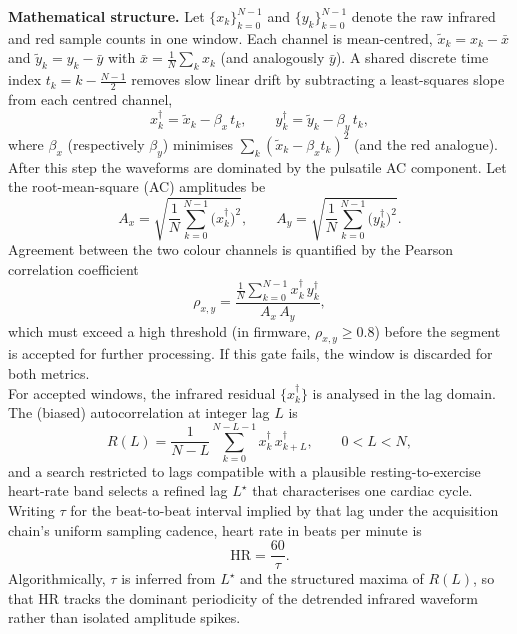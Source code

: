 \noindent \textbf{Mathematical structure.} Let $\{x_k\}_{k=0}^{N-1}$ and $\{y_k\}_{k=0}^{N-1}$ denote
the raw infrared and red sample counts in one window. Each channel is mean-centred,
$\tilde{x}_k = x_k - \bar{x}$ and $\tilde{y}_k = y_k - \bar{y}$ with $\bar{x}=\frac{1}{N}\sum_k x_k$
(and analogously $\bar{y}$). A shared discrete time index $t_k = k - \frac{N-1}{2}$ removes slow
linear drift by subtracting a least-squares slope from each centred channel,
\begin{equation}
  x^{\dagger}_k = \tilde{x}_k - \beta_x\, t_k, \qquad
  y^{\dagger}_k = \tilde{y}_k - \beta_y\, t_k,
\end{equation}
where $\beta_x$ (respectively $\beta_y$) minimises $\sum_k (\tilde{x}_k - \beta_x t_k)^2$ (and the
red analogue). After this step the waveforms are dominated by the pulsatile AC component. Let the
root-mean-square (AC) amplitudes be
\begin{equation}
  A_x = \sqrt{\frac{1}{N}\sum_{k=0}^{N-1} \bigl(x^{\dagger}_k\bigr)^2}, \qquad
  A_y = \sqrt{\frac{1}{N}\sum_{k=0}^{N-1} \bigl(y^{\dagger}_k\bigr)^2}.
\end{equation}
Agreement between the two colour channels is quantified by the Pearson correlation coefficient
\begin{equation}
  \rho_{x,y} =
  \frac{\frac{1}{N}\sum_{k=0}^{N-1} x^{\dagger}_k\, y^{\dagger}_k}{A_x\, A_y},
\end{equation}
which must exceed a high threshold (in firmware, $\rho_{x,y}\ge 0.8$) before the segment is accepted
for further processing. If this gate fails, the window is discarded for both metrics. \\

\noindent For accepted windows, the infrared residual $\{x^{\dagger}_k\}$ is analysed in the lag
domain. The (biased) autocorrelation at integer lag $L$ is
\begin{equation}
  R(L) = \frac{1}{N-L}\sum_{k=0}^{N-L-1} x^{\dagger}_k\, x^{\dagger}_{k+L}, \qquad 0 < L < N,
\end{equation}
and a search restricted to lags compatible with a plausible resting-to-exercise heart-rate band
selects a refined lag $L^\star$ that characterises one cardiac cycle. Writing $\tau$ for the
beat-to-beat interval implied by that lag under the acquisition chain's uniform sampling cadence,
heart rate in beats per minute is
\begin{equation}
  \mathrm{HR} = \frac{60}{\tau}.
\end{equation}
Algorithmically, $\tau$ is inferred from $L^\star$ and the structured maxima of $R(L)$, so that
$\mathrm{HR}$ tracks the dominant periodicity of the detrended infrared waveform rather than
isolated amplitude spikes. \\

